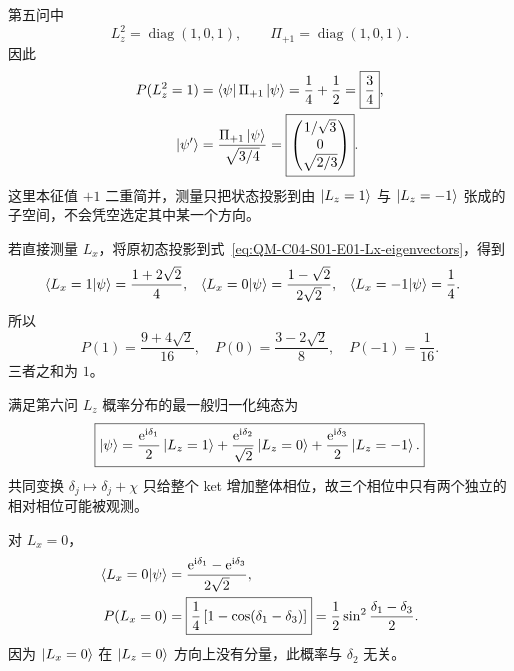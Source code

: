 \begin{checkedsolution}
第五问中
\[
  L_z^2=\operatorname{diag}(1,0,1),
  \qquad
  \Pi_{+1}=\operatorname{diag}(1,0,1).
\]
因此
\begin{align}
  P(L_z^2=1)
  &=\left\langle \psi\right|\Pi_{+1}\left|\psi\right\rangle
    =\frac14+\frac12
    =\boxed{\frac34},
  \label{eq:QM-C04-S01-E01-Lz2-probability}\\
  \left|\psi'\right\rangle
  &=\frac{\Pi_{+1}\left|\psi\right\rangle}{\sqrt{3/4}}
    =\boxed{
    \begin{pmatrix}
      1/\sqrt3\\0\\\sqrt{2/3}
    \end{pmatrix}}.
  \label{eq:QM-C04-S01-E01-Lz2-poststate}
\end{align}
这里本征值 $+1$ 二重简并，测量只把状态投影到由 $\left|L_z=1\right\rangle$ 与 $\left|L_z=-1\right\rangle$ 张成的子空间，不会凭空选定其中某一个方向。

若直接测量 $L_x$，将原初态投影到式~\eqref{eq:QM-C04-S01-E01-Lx-eigenvectors}，得到
\begin{align}
  \left\langle L_x=1 \middle| \psi \right\rangle
  &=\frac{1+2\sqrt2}{4},
  &
  \left\langle L_x=0 \middle| \psi \right\rangle
  &=\frac{1-\sqrt2}{2\sqrt2},
  &
  \left\langle L_x=-1 \middle| \psi \right\rangle
  &=\frac14.
  \label{eq:QM-C04-S01-E01-general-state-Lx-amplitudes}
\end{align}
所以
\begin{equation}
  \boxed{
  P(1)=\frac{9+4\sqrt2}{16},
  \quad
  P(0)=\frac{3-2\sqrt2}{8},
  \quad
  P(-1)=\frac1{16}.}
  \label{eq:QM-C04-S01-E01-general-state-Lx-probabilities}
\end{equation}
三者之和为 $1$。

满足第六问 $L_z$ 概率分布的最一般归一化纯态为
\begin{equation}
  \boxed{
  \left|\psi\right\rangle
  =\frac{\mathrm{e}^{\mathrm{i}\delta_1}}2\left|L_z=1\right\rangle
   +\frac{\mathrm{e}^{\mathrm{i}\delta_2}}{\sqrt2}\left|L_z=0\right\rangle
   +\frac{\mathrm{e}^{\mathrm{i}\delta_3}}2\left|L_z=-1\right\rangle.}
  \label{eq:QM-C04-S01-E01-phase-state}
\end{equation}
共同变换 $\delta_j\mapsto\delta_j+\chi$ 只给整个 ket 增加整体相位，故三个相位中只有两个独立的相对相位可能被观测。

对 $L_x=0$，
\begin{align}
  \left\langle L_x=0 \middle| \psi \right\rangle
  &=\frac{\mathrm{e}^{\mathrm{i}\delta_1}-\mathrm{e}^{\mathrm{i}\delta_3}}{2\sqrt2},
  \notag\\
  P(L_x=0)
  &=\boxed{
  \frac14\left[1-\cos(\delta_1-\delta_3)\right]}
   =\frac12\sin^2\frac{\delta_1-\delta_3}{2}.
  \label{eq:QM-C04-S01-E01-Lx0-phase-probability}
\end{align}
因为 $\left|L_x=0\right\rangle$ 在 $\left|L_z=0\right\rangle$ 方向上没有分量，此概率与 $\delta_2$ 无关。


\end{checkedsolution}

